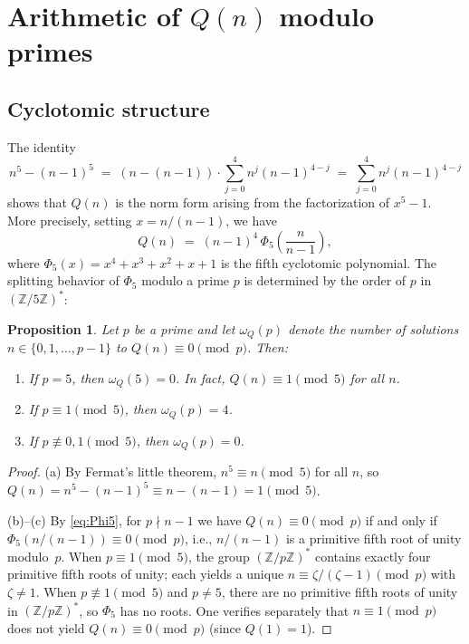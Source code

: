\documentclass[11pt,a4paper]{article}
\theoremstyle{plain}
\newtheorem{proposition}[theorem]{Proposition}
\theoremstyle{definition}
\theoremstyle{remark}
\begin{document}
\section{Arithmetic of $Q(n)$ modulo primes}
\label{sec:arithmetic}

\subsection{Cyclotomic structure}

The identity
\begin{equation}\label{eq:factor}
n^5 - (n-1)^5 \;=\; (n - (n-1)) \cdot \sum_{j=0}^{4} n^j (n-1)^{4-j} \;=\; \sum_{j=0}^{4} n^j (n-1)^{4-j}
\end{equation}
shows that $Q(n)$ is the norm form arising from the factorization of $x^5 - 1$. More precisely, setting $x = n/(n-1)$, we have
\begin{equation}\label{eq:Phi5}
Q(n) \;=\; (n-1)^4 \,\Phi_5\!\left(\frac{n}{n-1}\right),
\end{equation}
where $\Phi_5(x) = x^4 + x^3 + x^2 + x + 1$ is the fifth cyclotomic polynomial. The splitting behavior of $\Phi_5$ modulo a prime $p$ is determined by the order of $p$ in $(\mathbb{Z}/5\mathbb{Z})^*$:

\begin{proposition}\label{prop:roots}
Let $p$ be a prime and let $\omega_Q(p)$ denote the number of solutions $n \in \{0, 1, \ldots, p-1\}$ to $Q(n) \equiv 0 \pmod{p}$. Then:
\begin{enumerate}[label=\emph{(\alph*)}]
\item If $p = 5$, then $\omega_Q(5) = 0$. In fact, $Q(n) \equiv 1 \pmod{5}$ for all $n$.
\item If $p \equiv 1 \pmod{5}$, then $\omega_Q(p) = 4$.
\item If $p \not\equiv 0, 1 \pmod{5}$, then $\omega_Q(p) = 0$.
\end{enumerate}
\end{proposition}

\begin{proof}
(a) By Fermat's little theorem, $n^5 \equiv n \pmod{5}$ for all $n$, so $Q(n) = n^5 - (n-1)^5 \equiv n - (n-1) = 1 \pmod{5}$.

(b)--(c) By \eqref{eq:Phi5}, for $p \nmid n-1$ we have $Q(n) \equiv 0 \pmod{p}$ if and only if $\Phi_5(n/(n-1)) \equiv 0 \pmod{p}$, i.e., $n/(n-1)$ is a primitive fifth root of unity modulo~$p$. When $p \equiv 1 \pmod{5}$, the group $(\mathbb{Z}/p\mathbb{Z})^*$ contains exactly four primitive fifth roots of unity; each yields a unique $n \equiv \zeta/(\zeta - 1) \pmod{p}$ with $\zeta \ne 1$. When $p \not\equiv 1 \pmod{5}$ and $p \ne 5$, there are no primitive fifth roots of unity in $(\mathbb{Z}/p\mathbb{Z})^*$, so $\Phi_5$ has no roots. One verifies separately that $n \equiv 1 \pmod{p}$ does not yield $Q(n) \equiv 0 \pmod{p}$ (since $Q(1) = 1$).
\end{proof}
\end{document}
